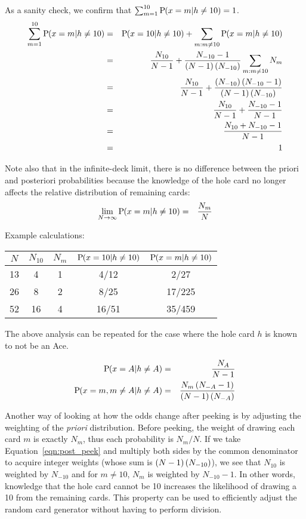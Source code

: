 As a sanity check, we confirm that $\sum_{m=1}^{10}{\textrm{P}\hspace{-.5ex}\left(x=m|h\neq{}10\right)}=1$.
\begin{eqnarray}
\sum_{m=1}^{10}{\textrm{P}\hspace{-.5ex}\left(x=m|h\neq{}10\right)} &=&
\textrm{P}\hspace{-.5ex}\left(x=10|h\neq{}10\right) +\sum_{m:m\neq{}10}^{}{\textrm{P}\hspace{-.5ex}\left(x=m|h\neq{}10\right)}\\
&=& \frac{N_{10}}{N-1}
  +\frac{N_{-10}-1}{\left(N-1\right)\left(N_{-10}\right)} \sum_{m:m\neq{}10}^{}{N_m} \label{eqn:post_peek} \\
&=& \frac{N_{10}}{N-1} +\frac{\left(N_{-10}\right)\left(N_{-10}-1\right)}{\left(N-1\right)\left(N_{-10}\right)}\\
&=& \frac{N_{10}}{N-1} +\frac{N_{-10}-1}{N-1}\\
&=& \frac{N_{10}+N_{-10}-1}{N-1}\\
&=& 1
\end{eqnarray}

Note also that in the infinite-deck limit, there is no difference
between the priori and posteriori probabilities because
the knowledge of the hole card no longer affects the relative distribution of 
remaining cards:
\begin{eqnarray}
\lim_{N\rightarrow\infty}{\textrm{P}\hspace{-.5ex}\left(x=m|h\neq{}10\right)} &=& \frac{N_m}{N}
\end{eqnarray}

\noindent
Example calculations:
\begin{center}
\begin{tabular}{|c|c|c||c|c|}
\hline
$N$ & $N_10$ & $N_m$ & $\textrm{P}\hspace{-.5ex}\left(x=10|h\neq{}10\right)$ & $\textrm{P}\hspace{-.5ex}\left(x=m|h\neq{}10\right)$ \\ \hline \hline
13 & 4 & 1 & 4/12 & 2/27 \\ \hline
26 & 8 & 2 & 8/25 & 17/225 \\ \hline
52 & 16 & 4 & 16/51 & 35/459 \\ \hline
\end{tabular}
\end{center}

The above analysis can be repeated for the case where the hole card $h$
is known to not be an Ace.  

\begin{eqnarray}
\textrm{P}\hspace{-.5ex}\left(x=A|h\neq{}A\right) &=& \frac{N_{A}}{N-1}\\
\textrm{P}\hspace{-.5ex}\left(x=m,m\neq{}A|h\neq{}A\right) &=&
  \frac{N_m\left(N_{-A}-1\right)}{\left(N-1\right)\left(N_{-A}\right)}
\end{eqnarray}

Another way of looking at how the odds change after peeking is
by adjusting the weighting of the \emph{priori} distribution.
Before peeking, the weight of drawing each card $m$ is exactly
$N_m$, thus each probability is $N_m/N$.
If we take Equation~\ref{eqn:post_peek} and multiply both sides
by the common denominator to acquire integer weights (whose sum is 
$\left(N-1\right)\left(N_{-10}\right)$),
we see that $N_10$ is weighted by $N_{-10}$ and for $m\neq{}10$, 
$N_m$ is weighted by $N_{-10}-1$.
In other words, knowledge that the hole card cannot be 10 increases
the likelihood of drawing a 10 from the remaining cards.
This property can be used to efficiently adjust the
random card generator without having to perform division.

